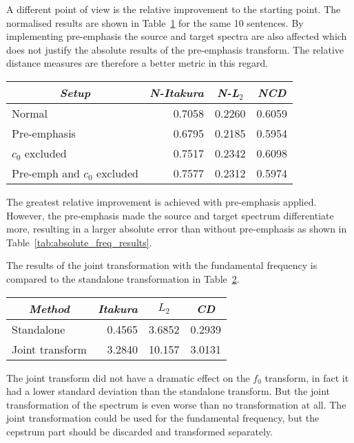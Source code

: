 A different point of view is the relative improvement to the starting point. The normalised results are shown in Table~\ref{tab:normalised_freq_results} for the same 10 sentences. By implementing pre-emphasis the source and target spectra are also affected which does not justify the absolute results of the pre-emphasis transform. The relative distance measures are therefore a better metric in this regard.
\begin{table}[htbp]
	\begin{center}
		\label{tab:normalised_freq_results}
		\begin{tabular}{lrrr}
			\toprule
			\multicolumn{1}{c}{\emph{Setup}} & \multicolumn{1}{c}{\emph{N-Itakura}} & \multicolumn{1}{c}{\emph{N-L$_2$}} & \multicolumn{1}{c}{\emph{NCD}}\\
			\midrule
			Normal & 0.7058 & 0.2260 & 0.6059 \\
			Pre-emphasis &  0.6795 & 0.2185 & 0.5954 \\
			$c_0$ excluded & 0.7517 & 0.2342 & 0.6098 \\
			Pre-emph and $c_0$ excluded & 0.7577 & 0.2312 & 0.5974 \\
			\bottomrule			
		\end{tabular}		
	\end{center}	
\end{table}
The greatest relative improvement is achieved with pre-emphasis applied. However, the pre-emphasis made the source and target spectrum differentiate more, resulting in a larger absolute error than without pre-emphasis as shown in Table~\ref{tab:absolute_freq_results}. 

The results of the joint transformation with the fundamental frequency is compared to the standalone transformation in Table~\ref{tab:spectrum_joint_transform}.
\begin{table}[htbp]
	\begin{center}
		\label{tab:spectrum_joint_transform}
		\begin{tabular}{lrrr}
			\toprule
			\multicolumn{1}{c}{\emph{Method}} & \multicolumn{1}{c}{\emph{Itakura}} & \multicolumn{1}{c}{\emph{$L_2$}} & \multicolumn{1}{c}{\emph{CD}}\\
			\midrule
			Standalone & 0.4565 & 3.6852 & 0.2939 \\
			Joint transform & 3.2840 & 10.157 & 3.0131 \\
			\bottomrule			
		\end{tabular}		
	\end{center}	
\end{table}
The joint transform did not have a dramatic effect on the $f_0$ transform, in fact it had a lower standard deviation than the standalone transform. But the joint transformation of the spectrum is even worse than no transformation at all. The joint transformation could be used for the fundamental frequency, but the cepstrum part should be discarded and transformed separately. 

